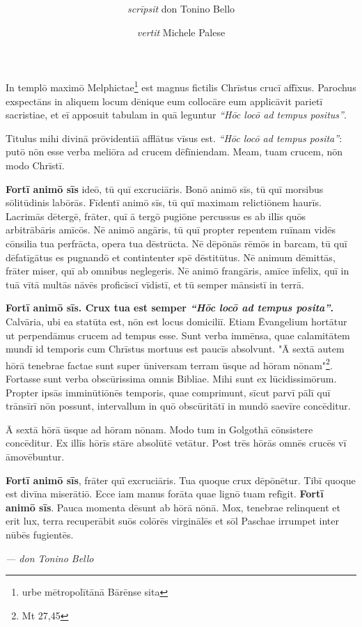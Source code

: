\documentclass[a4paper, 11pt]{article}
\title{
	\Huge{\MyTitle}
}
\author{
	\textit{scrīpsit} don Tonino Bello \and \textit{vertit} Michele Palese
}
\date{}
\begin{document}
	\maketitle
	
	In templō maximō Melphictae\footnote{urbe mētropolītānā Bārēnse sita} est magnus fictilis Chrīstus crucī affīxus.
	Parochus exspectāns in aliquem locum dēnique eum collocāre eum applicāvit parietī sacristiae, et eī apposuit tabulam in quā leguntur \textit{``Hōc locō ad tempus positus''}.
	
	Titulus mihi divinā prōvidentiā afflātus vīsus est.
	\textit{``Hōc locō ad tempus posita''}: putō nōn esse verba meliōra ad crucem dēfīniendam.
	Meam, tuam crucem, nōn modo Chrīstī.
	
	\textbf{Fortī animō sīs} ideō, tū quī excruciāris.
	Bonō animō sīs, tū quī morsibus sōlitūdinis labōrās.
	Fīdentī animō sīs, tū quī maximam relictiōnem haurīs.
	Lacrimās dētergē, frāter, quī ā tergō pugiōne percussus es ab illīs quōs arbitrābāris amīcōs.
	Nē animō angāris, tū quī propter repentem ruīnam vidēs cōnsilia tua perfrācta, opera tua dēstrūcta.
	Nē dēpōnās rēmōs in barcam, tū quī dēfatīgātus es pugnandō et contintenter spē dēstitūtus.
	Nē animum dēmittās, frāter miser, quī ab omnibus neglegeris.
	Nē animō frangāris, amīce īnfēlix, quī in tuā vītā multās nāvēs proficīscī vīdistī, et tū semper mānsistī in terrā.
	
	\textbf{Fortī animō sīs. Crux tua est semper \textit{``Hōc locō ad tempus posita''}.}
	Calvāria, ubi ea statūta est, nōn est locus domiciliī. Etiam Ēvangelium
	hortātur ut perpendāmus crucem ad tempus esse. Sunt verba immēnsa, quae
	calamitātem mundī id temporis cum Chrīstus mortuus est paucīs absolvunt.
	"Ā sextā autem hōrā tenebrae factae sunt super ūniversam terram ūsque
	ad hōram nōnam"\footnote{Mt 27,45}. Fortasse sunt verba obscūrissima omnis Bibliae.
	Mihi sunt ex lūcidissimōrum. Propter ipsās imminūtiōnēs temporis, quae
	comprimunt, sīcut parvī pālī quī trānsīrī nōn possunt, intervallum in
	quō obscūritātī in mundō saevīre concēditur.
	
	Ā sextā hōrā ūsque ad hōram nōnam. Modo tum in Golgothā cōnsistere
	concēditur. Ex illīs hōrīs stāre absolūtē vetātur. Post trēs hōrās omnēs
	crucēs vī āmovēbuntur.
	
	\textbf{Fortī animō sīs}, frāter quī excruciāris.
	Tua quoque crux dēpōnētur.
	Tibī quoque est divīna miserātiō.
	Ecce iam manus forāta quae lignō tuam refīgit.
	\textbf{Fortī animō sīs}.
	Pauca momenta dēsunt ab hōrā nōnā.
	Mox, tenebrae relinquent et erit lux, terra recuperābit suōs colōrēs virginālēs et sōl Paschae irrumpet inter nūbēs fugientēs.
	
	\bigskip
	
	\raggedleft \textit{--- don Tonino Bello} \hspace{1em}
\end{document}
